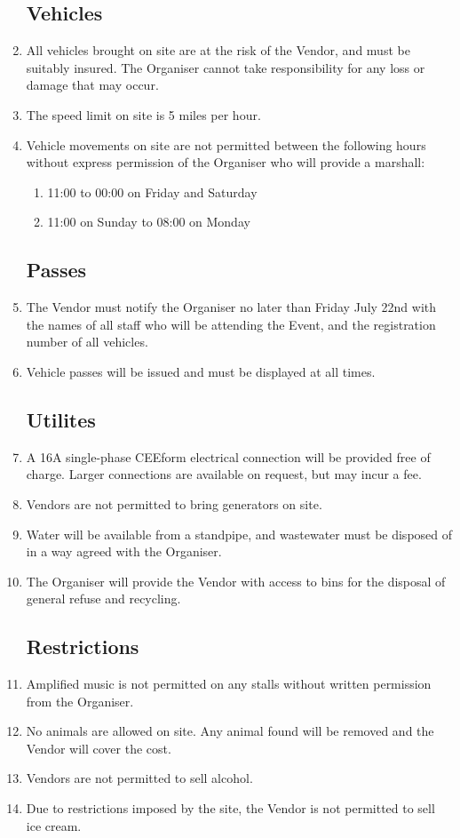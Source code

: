 \begin{enumerate}
\subsection*{Vehicles}
\item All vehicles brought on site are at the risk of the Vendor, and must be suitably insured.
        The Organiser cannot take responsibility for any loss or damage that may occur.
\item The speed limit on site is 5 miles per hour.
\item Vehicle movements on site are not permitted between the following hours without express
        permission of the Organiser who will provide a marshall:
\begin{enumerate}
    \item 11:00 to 00:00 on Friday and Saturday
    \item 11:00 on Sunday to 08:00 on Monday
\end{enumerate}

\subsection*{Passes}
\item The Vendor must notify the Organiser no later than Friday July 22nd with the names of
        all staff who will be attending the Event, and the registration number of all vehicles.
\item Vehicle passes will be issued and must be displayed at all times.

\subsection*{Utilites}
\item A 16A single-phase CEEform electrical connection will be provided free of charge. Larger
        connections are available on request, but may incur a fee.
\item Vendors are not permitted to bring generators on site.
\item Water will be available from a standpipe, and wastewater must be disposed of in a way
        agreed with the Organiser.
\item The Organiser will provide the Vendor with access to bins for the disposal of general
        refuse and recycling.

\subsection*{Restrictions}
\item Amplified music is not permitted on any stalls without written permission from the Organiser.
\item No animals are allowed on site. Any animal found will be removed and the Vendor will
        cover the cost.
\item Vendors are not permitted to sell alcohol.
\item Due to restrictions imposed by the site, the Vendor is not permitted to sell ice cream.


\end{enumerate}
